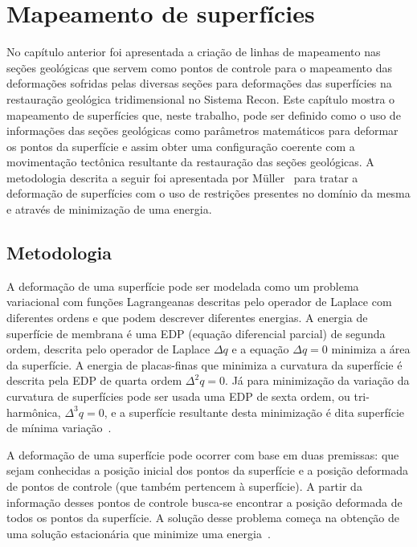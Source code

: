 
\chapter{Mapeamento de superfícies}

No capítulo anterior foi apresentada a criação de linhas de mapeamento nas seções geológicas que servem como pontos de controle para o mapeamento das deformações sofridas pelas diversas seções para deformações das superfícies na restauração geológica tridimensional no Sistema Recon. Este capítulo mostra o mapeamento de superfícies que, neste trabalho, pode ser definido como o uso de informações das seções geológicas como parâmetros matemáticos para deformar os pontos da superfície e assim obter uma configuração coerente com a movimentação tectônica resultante da restauração das seções geológicas. A metodologia descrita a seguir foi apresentada por Müller~\cite{Muller} para tratar a deformação de superfícies com o uso de restrições presentes no domínio da mesma e através de minimização de uma energia.

\section{Metodologia}\label{surface-mapping-metodology}

A deformação de uma superfície pode ser modelada como um problema variacional com funções Lagrangeanas descritas pelo operador de Laplace com diferentes ordens e que podem descrever diferentes energias. A energia de superfície de membrana é uma EDP (equação diferencial parcial) de segunda ordem, descrita pelo operador de Laplace $\Delta{q}$ e a equação $\Delta{q}=0$ minimiza a área da superfície. A energia de placas-finas que minimiza a curvatura da superfície é descrita pela EDP de quarta ordem $\Delta^2{q}=0$. Já para minimização da variação da curvatura de superfícies pode ser usada uma EDP de sexta ordem, ou tri-harmônica, $\Delta^3{q}=0$, e a superfície resultante desta minimização é dita superfície de mínima variação~\cite{Muller, Botsch}.

A deformação de uma superfície pode ocorrer com base em duas premissas: que sejam conhecidas a posição inicial dos pontos da superfície e a posição deformada de pontos de controle (que também pertencem à superfície). A partir da informação desses pontos de controle busca-se encontrar a posição deformada de todos os pontos da superfície. A solução desse problema começa na obtenção de uma solução estacionária que minimize uma energia~\cite{Muller}.


